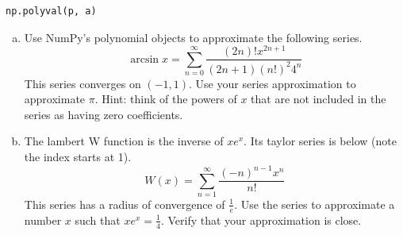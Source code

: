 \begin{lstlisting}
np.polyval(p, a)
\end{lstlisting}

\begin{problem}
\begin{enumerate}[a)]
\item Use NumPy's polynomial objects to approximate the following series.
\[
\arcsin x = \sum_{n=0}^{\infty} \frac{\left(2 n\right) ! x^{2 n + 1}}{\left(2 n + 1\right)\left(n!\right)^2 4^n}
\]
This series converges on $(-1, 1)$. Use your series approximation to approximate $\pi$. Hint: think of the powers of $x$ that
are not included in the series as having zero coefficients.

\item The lambert W function is the inverse of $x e^x$.
Its taylor series is below (note the index starts at 1).
\[
W(x) = \sum_{n=1}^{\infty} \frac{\left(-n\right)^{n-1} x^n}{n!}
\]
This series has a radius of convergence of $\frac{1}{e}$.
Use the series to approximate a number $x$ such that $x e^x = \frac{1}{4}$.
Verify that your approximation is close.


\end{enumerate}
\end{problem}

